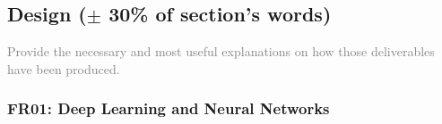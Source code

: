 \subsection{Design ($\pm$ 30\% of section's words)}
\textcolor{gray}{Provide the necessary and most useful explanations on how those
deliverables have been produced.}

\subsubsection{FR01: Deep Learning and Neural Networks}



